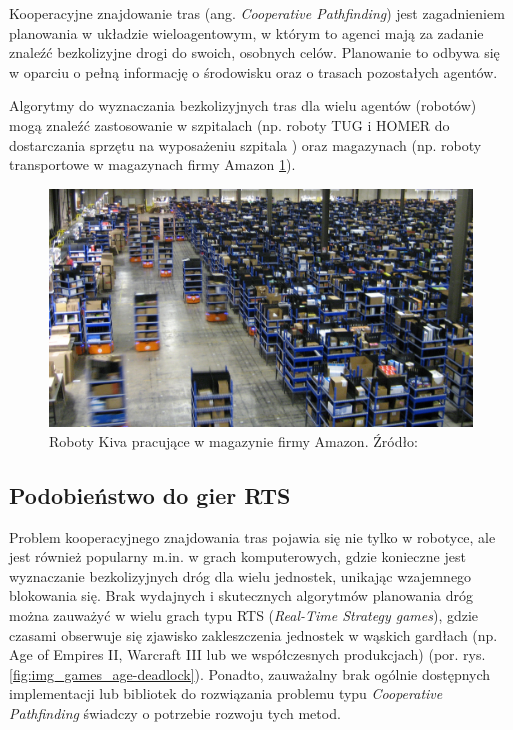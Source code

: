Kooperacyjne znajdowanie tras (ang. {\it Cooperative Pathfinding}) jest zagadnieniem planowania w układzie wieloagentowym, w którym to agenci mają za zadanie znaleźć bezkolizyjne drogi do swoich, osobnych celów. Planowanie to odbywa się w oparciu o pełną informację o środowisku oraz o trasach pozostałych agentów. \cite{cooppath}

Algorytmy do wyznaczania bezkolizyjnych tras dla wielu agentów (robotów) mogą znaleźć zastosowanie w szpitalach (np. roboty TUG i HOMER do dostarczania sprzętu na wyposażeniu szpitala \cite{tughomer}) oraz magazynach (np. roboty transportowe w magazynach firmy Amazon \ref{fig:image_kiva_amazon}).

\begin{figure}[H]
	\centering
	\includegraphics[width=14cm]{img/kiva-amazon}
	\caption{Roboty Kiva pracujące w magazynie firmy Amazon. Źródło: \cite{amazonkiva}}
	\label{fig:image_kiva_amazon}
\end{figure}

\subsection{Podobieństwo do gier RTS}
Problem kooperacyjnego znajdowania tras pojawia się nie tylko w robotyce, ale jest również popularny m.in. w grach komputerowych, gdzie konieczne jest wyznaczanie bezkolizyjnych dróg dla wielu jednostek, unikając wzajemnego blokowania się. Brak wydajnych i skutecznych algorytmów planowania dróg można zauważyć w wielu grach typu RTS ({\it Real-Time Strategy games}), gdzie czasami obserwuje się zjawisko zakleszczenia jednostek w wąskich gardłach (np. Age of Empires II, Warcraft III lub we współczesnych produkcjach) \cite{efficient_coop_pathplanning} (por. rys. \ref{fig:img_games_age-deadlock}). Ponadto, zauważalny brak ogólnie dostępnych implementacji lub bibliotek do rozwiązania problemu typu {\it Cooperative Pathfinding} świadczy o potrzebie rozwoju tych metod.

